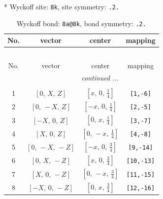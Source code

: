\documentclass[fleqn,8pt]{jsarticle}
\begin{document}
* Wyckoff site: {\tt 8k}, site symmetry: {\tt .2.}
\renewcommand{\arraystretch}{1.2}
\begin{longtable}{cccc}
\caption{Wyckoff bond: {\tt 8a@8k}, bond symmetry: {\tt .2.}}
 \\
 \hline \hline
No. & vector & center & mapping \\ \hline \endfirsthead

\multicolumn{3}{l}{\tablename\ \thetable{}} \\
 \hline \hline
No. & vector & center & mapping \\ \hline \endhead

 \hline \hline
\multicolumn{3}{r}{\footnotesize\it continued ...} \\ \endfoot

 \hline \hline
\multicolumn{3}{r}{} \\ \endlastfoot

1 & $\left[ 0,\, X,\, Z \right]$ & $\left[ x,\, 0,\, \frac{1}{4} \right]$ & {\tt [1,-6]} \\ \hline
2 & $\left[ 0,\, - X,\, Z \right]$ & $\left[ - x,\, 0,\, \frac{1}{4} \right]$ & {\tt [2,-5]} \\ \hline
3 & $\left[ - X,\, 0,\, Z \right]$ & $\left[ 0,\, x,\, \frac{1}{4} \right]$ & {\tt [3,-7]} \\ \hline
4 & $\left[ X,\, 0,\, Z \right]$ & $\left[ 0,\, - x,\, \frac{1}{4} \right]$ & {\tt [4,-8]} \\ \hline
5 & $\left[ 0,\, - X,\, - Z \right]$ & $\left[ - x,\, 0,\, \frac{3}{4} \right]$ & {\tt [9,-14]} \\ \hline
6 & $\left[ 0,\, X,\, - Z \right]$ & $\left[ x,\, 0,\, \frac{3}{4} \right]$ & {\tt [10,-13]} \\ \hline
7 & $\left[ X,\, 0,\, - Z \right]$ & $\left[ 0,\, - x,\, \frac{3}{4} \right]$ & {\tt [11,-15]} \\ \hline
8 & $\left[ - X,\, 0,\, - Z \right]$ & $\left[ 0,\, x,\, \frac{3}{4} \right]$ & {\tt [12,-16]} \\
\end{longtable}
\renewcommand{\arraystretch}{1.2}
\end{document}
